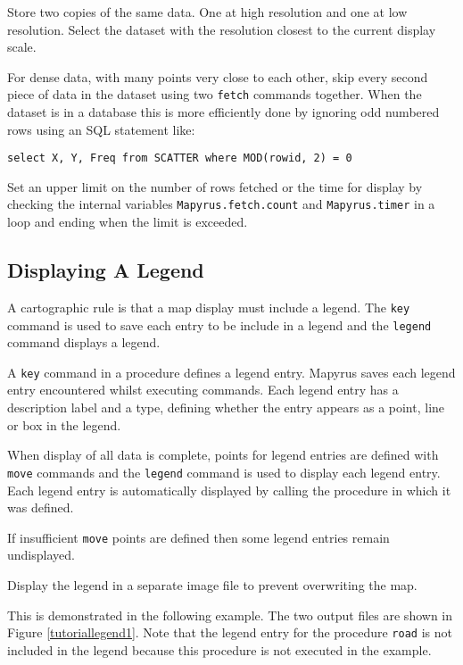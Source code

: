 Store two copies of the same data.  One at high resolution and one at low
resolution.  Select the dataset with the resolution closest to the current
display scale.

For dense data, with many points very close to each other, skip every second
piece of data in the dataset using two \texttt{fetch} commands together.  When
the dataset is in a database this is more efficiently done by ignoring odd
numbered rows using an SQL statement like:

\begin{verbatim}
select X, Y, Freq from SCATTER where MOD(rowid, 2) = 0
\end{verbatim}

Set an upper limit on the number of rows fetched or the time for display by
checking the internal variables \texttt{Mapyrus.fetch.count} and
\texttt{Mapyrus.timer} in a loop and ending when the limit is exceeded.

\subsection{Displaying A Legend}

A cartographic rule is that a map display must include a legend.  The
\texttt{key} command is used to save each entry to be include in a legend and
the \texttt{legend} command displays a legend.

A \texttt{key} command in a procedure defines a legend entry.  Mapyrus saves
each legend entry encountered whilst executing commands.  Each legend entry has
a description label and a type, defining whether the entry appears as a point,
line or box in the legend.

When display of all data is complete, points for legend entries are defined
with \texttt{move} commands and the \texttt{legend} command is used to display
each legend entry.  Each legend entry is automatically displayed by calling the
procedure in which it was defined.

If insufficient \texttt{move} points are defined then some legend entries
remain undisplayed.

Display the legend in a separate image file to prevent overwriting the map.

This is demonstrated in the following example.
The two output files are shown in Figure \ref{tutoriallegend1}.
Note that the legend entry for the procedure \texttt{road} is
not included in the legend because this procedure is not
executed in the example.

